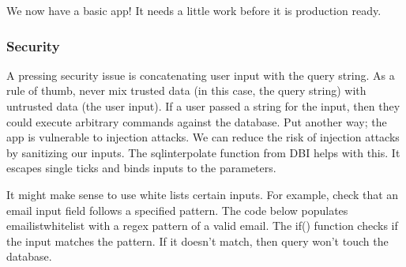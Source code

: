 \documentclass[]{article}
\newenvironment{Shaded}{\begin{snugshade}}{\end{snugshade}}
\newcommand{\CommentTok}[1]{\textcolor[rgb]{0.56,0.35,0.01}{\textit{#1}}}
\newcommand{\ControlFlowTok}[1]{\textcolor[rgb]{0.13,0.29,0.53}{\textbf{#1}}}
\newcommand{\DataTypeTok}[1]{\textcolor[rgb]{0.13,0.29,0.53}{#1}}
\newcommand{\KeywordTok}[1]{\textcolor[rgb]{0.13,0.29,0.53}{\textbf{#1}}}
\newcommand{\NormalTok}[1]{#1}
\newcommand{\OperatorTok}[1]{\textcolor[rgb]{0.81,0.36,0.00}{\textbf{#1}}}
\newcommand{\StringTok}[1]{\textcolor[rgb]{0.31,0.60,0.02}{#1}}
\begin{document}
We now have a basic app! It needs a little work before it is production
ready.

\hypertarget{security}{%
\subsubsection{Security}\label{security}}

A pressing security issue is concatenating user input with the query
string. As a rule of thumb, never mix trusted data (in this case, the
query string) with untrusted data (the user input). If a user passed a
string for the input, then they could execute arbitrary commands against
the database. Put another way; the app is vulnerable to injection
attacks. We can reduce the risk of injection attacks by sanitizing our
inputs. The sqlinterpolate function from DBI helps with this. It escapes
single ticks and binds inputs to the parameters.

\begin{Shaded}
\end{Shaded}

It might make sense to use white lists certain inputs. For example,
check that an email input field follows a specified pattern. The code
below populates emailistwhitelist with a regex pattern of a valid email.
The if() function checks if the input matches the pattern. If it doesn't
match, then query won't touch the database.

\begin{Shaded}
\end{Shaded}
\end{document}
